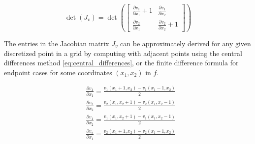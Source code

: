 \documentclass[lettersize,journal]{IEEEtran}
\begin{document}
\begin{equation} \label{eq:2d_jacobian_matrix_det}
    \det(J_{v}) = 
    \det\left( 
    \begin{bmatrix}
    \frac{\partial v_1}{\partial x_1} + 1 & \frac{\partial v_1}{\partial x_2} \\
    \frac{\partial v_2}{\partial x_1} & \frac{\partial v_2}{\partial x_2} + 1
    \end{bmatrix}
    \right)
\end{equation}

The entries in the Jacobian matrix $J_{v}$ can be approximately derived for any given discretized point in a grid by computing with adjacent points using the central differences method \autoref{eq:central_differences}, or the finite difference formula for endpoint cases for some coordinates $(x_1, x_2)$ in $f$.

\begin{equation} \label{eq:central_differences}
    \begin{aligned}
        & \frac{\partial v_1}{\partial x_1} = \frac{v_1(x_1 + 1, x_2) - v_1(x_1 - 1, x_2)}{2} \\
        & \frac{\partial v_2}{\partial x_2} = \frac{v_2(x_1, x_2 + 1) - v_2(x_1, x_2 - 1)}{2} \\
        & \frac{\partial v_1}{\partial x_2} = \frac{v_1(x_1, x_2 + 1) - v_1(x_1, x_2 - 1)}{2} \\
        & \frac{\partial v_2}{\partial x_1} = \frac{v_2(x_1 + 1, x_2) - v_2(x_1 - 1, x_2)}{2} \\
    \end{aligned}
\end{equation}
\end{document}
